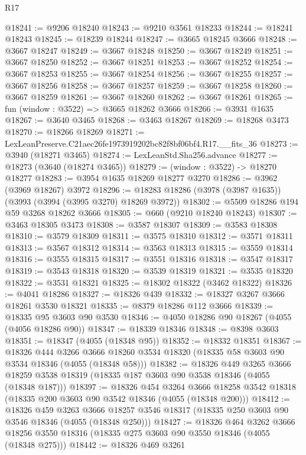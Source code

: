 \begin{lexlean}{R17}
\begin{coremodule}
@18241 := @9206 @18240
@18243 := @9210 @3561 @18233
@18244 := @18241 @18243
@18245 := @18239 @18244
@18247 := @3665 @18245 @3666
@18248 := @3667 @18247
@18249 := @3667 @18248
@18250 := @3667 @18249
@18251 := @3667 @18250
@18252 := @3667 @18251
@18253 := @3667 @18252
@18254 := @3667 @18253
@18255 := @3667 @18254
@18256 := @3667 @18255
@18257 := @3667 @18256
@18258 := @3667 @18257
@18259 := @3667 @18258
@18260 := @3667 @18259
@18261 := @3667 @18260
@18262 := @3667 @18261
@18265 := fun (window : @3522) => @3665 @18262 @3666
@18266 := @3931 @1635
@18267 := @3640 @3465
@18268 := @3463 @18267
@18269 := @18268 @3473
@18270 := @18266 @18269
@18271 := LexLeanPreserve.C21aec26fe1973919202bc82f8bf06bf4.R17.__fits_36
@18273 := @3940 (@18271 @3465)
@18274 := LexLeanStd.Sha256.advance
@18277 := @18273 (@3640 (@18274 @3465))
@18279 := (window : @3522) -> @18270 @18277
@18283 := @3954 @1635 @18269 @18277 @3270
@18286 := @3962 (@3969 @18267) @3972
@18296 := @18283 @18286 (@3978 (@3987 @1635)) (@3993 (@3994 (@3995 @3270) @18269 @3972))
@18302 := @5509 @18286 @194 @59 @3268 @18262 @3666
@18305 := @660 (@9210 @18240 @18243)
@18307 := @3463 @18305 @3473
@18308 := @3587 @18307
@18309 := @3583 @18308
@18310 := @3579 @18309
@18311 := @3575 @18310
@18312 := @3571 @18311
@18313 := @3567 @18312
@18314 := @3563 @18313
@18315 := @3559 @18314
@18316 := @3555 @18315
@18317 := @3551 @18316
@18318 := @3547 @18317
@18319 := @3543 @18318
@18320 := @3539 @18319
@18321 := @3535 @18320
@18322 := @3531 @18321
@18325 := @18302 @18322 (@3462 @18322)
@18326 := @4041 @18286
@18327 := @18326 @439
@18332 := @18327 @3267 @3666 @18261 @3530 @18321
@18335 := @8379 @18286 @112 @3666
@18339 := @18335 @95 @3603 @90 @3530
@18346 := @4050 @18286 @90 @18267 (@4055 (@4056 @18286 @90))
@18347 := @18339 @18346
@18348 := @8398 @3603
@18351 := @18347 (@4055 (@18348 @95))
@18352 := @18332 @18351
@18367 := @18326
    @444
    @3266
    @3666
    @18260
    @3534
    @18320
    (@18335 @58 @3603 @90 @3534 @18346 (@4055 (@18348 @58)))
@18382 := @18326
    @449
    @3265
    @3666
    @18259
    @3538
    @18319
    (@18335 @187 @3603 @90 @3538 @18346 (@4055 (@18348 @187)))
@18397 := @18326
    @454
    @3264
    @3666
    @18258
    @3542
    @18318
    (@18335 @200 @3603 @90 @3542 @18346 (@4055 (@18348 @200)))
@18412 := @18326
    @459
    @3263
    @3666
    @18257
    @3546
    @18317
    (@18335 @250 @3603 @90 @3546 @18346 (@4055 (@18348 @250)))
@18427 := @18326
    @464
    @3262
    @3666
    @18256
    @3550
    @18316
    (@18335 @275 @3603 @90 @3550 @18346 (@4055 (@18348 @275)))
@18442 := @18326
    @469
    @3261

\end{coremodule}
\end{lexlean}
